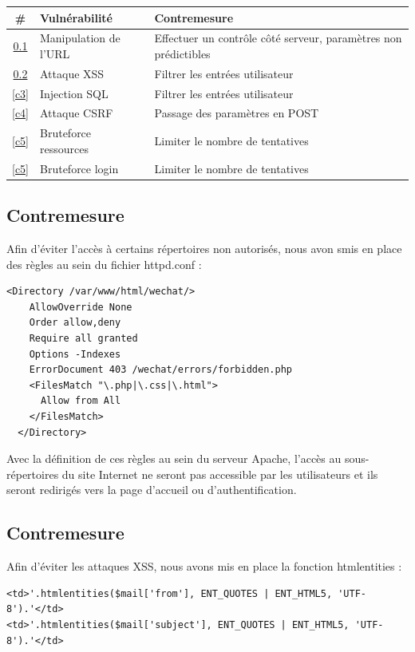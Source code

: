 \documentclass[12pt]{article}
\begin{document}
\begin{tabular}{| c | p{7.5cm} | p{7.5cm} |}
  \hline			
  \textbf{\# } &\textbf{ Vulnérabilité }& \textbf{Contremesure}\\
  \hline  
  \ref{c1} & Manipulation de l'URL & Effectuer un contrôle côté serveur, paramètres non prédictibles\\
  \hline
  \ref{c2} & Attaque XSS & Filtrer les entrées utilisateur \\
  \hline
  \ref{c3} & Injection SQL & Filtrer les entrées utilisateur\\
  \hline
  \ref{c4} & Attaque CSRF & Passage des paramètres en POST \\
  \hline
  \ref{c5} & Bruteforce ressources & Limiter le nombre de tentatives \\
  \hline
  \ref{c5} & Bruteforce login & Limiter le nombre de tentatives \\
  \hline

\end{tabular}

\subsection{Contremesure}\label{c1}

Afin d'éviter l'accès à certains répertoires non autorisés, nous avon smis en place des règles au sein du fichier httpd.conf :

\begin{lstlisting}[style=JAVA]
	<Directory /var/www/html/wechat/>
    AllowOverride None
    Order allow,deny
    Require all granted
    Options -Indexes
    ErrorDocument 403 /wechat/errors/forbidden.php
    <FilesMatch "\.php|\.css|\.html">
      Allow from All
    </FilesMatch>
  </Directory>
\end{lstlisting}

Avec la définition de ces règles au sein du serveur Apache, l'accès au sous-répertoires du site Internet ne seront pas accessible par les utilisateurs et ils seront redirigés vers la page d'accueil ou d'authentification. 

\subsection{Contremesure}\label{c2}

Afin d'éviter les attaques XSS, nous avons mis en place la fonction htmlentities :

\begin{lstlisting}[style=JAVA]
<td>'.htmlentities($mail['from'], ENT_QUOTES | ENT_HTML5, 'UTF-8').'</td>
<td>'.htmlentities($mail['subject'], ENT_QUOTES | ENT_HTML5, 'UTF-8').'</td>
\end{lstlisting}
\end{document}
